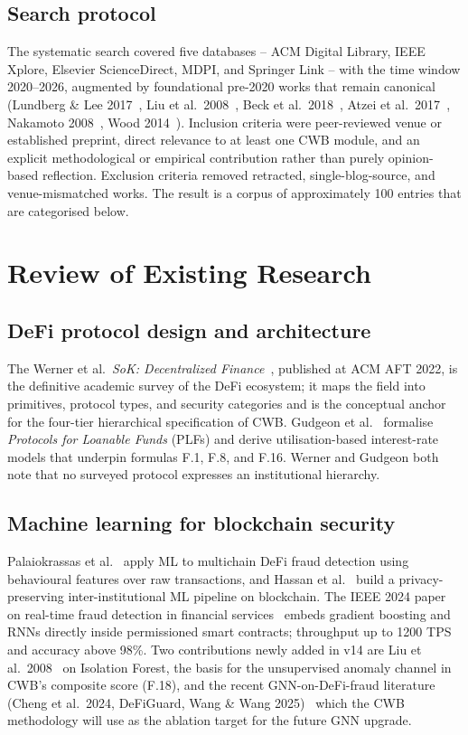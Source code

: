 \documentclass[12pt,a4paper]{report}
\begin{document}
\subsection{Search protocol}
\label{sec:prisma}
The systematic search covered five databases -- ACM Digital Library, IEEE Xplore, Elsevier ScienceDirect, MDPI, and Springer Link -- with the time window 2020--2026, augmented by foundational pre-2020 works that remain canonical (Lundberg \& Lee 2017~\cite{lundberg2017shap}, Liu et al.\ 2008~\cite{liu2008iforest}, Beck et al.\ 2018~\cite{beck2018governance}, Atzei et al.\ 2017~\cite{atzei2017sok}, Nakamoto 2008~\cite{nakamoto2008bitcoin}, Wood 2014~\cite{wood2014ethereum}). Inclusion criteria were peer-reviewed venue or established preprint, direct relevance to at least one CWB module, and an explicit methodological or empirical contribution rather than purely opinion-based reflection. Exclusion criteria removed retracted, single-blog-source, and venue-mismatched works. The result is a corpus of approximately 100 entries that are categorised below.

\section{Review of Existing Research}
\label{sec:lit-review}

\subsection{DeFi protocol design and architecture}
The Werner et al.\ \emph{SoK: Decentralized Finance}~\cite{werner2022sokDefi}, published at ACM AFT 2022, is the definitive academic survey of the DeFi ecosystem; it maps the field into primitives, protocol types, and security categories and is the conceptual anchor for the four-tier hierarchical specification of CWB. Gudgeon et al.~\cite{gudgeon2020plf} formalise \emph{Protocols for Loanable Funds} (PLFs) and derive utilisation-based interest-rate models that underpin formulas F.1, F.8, and F.16. Werner and Gudgeon both note that no surveyed protocol expresses an institutional hierarchy.

\subsection{Machine learning for blockchain security}
Palaiokrassas et al.~\cite{palaiokrassas2023ml} apply ML to multichain DeFi fraud detection using behavioural features over raw transactions, and Hassan et al.~\cite{hassan2022mlblockchain} build a privacy-preserving inter-institutional ML pipeline on blockchain. The IEEE 2024 paper on real-time fraud detection in financial services~\cite{aiblockchainFraud2024} embeds gradient boosting and RNNs directly inside permissioned smart contracts; throughput up to 1200 TPS and accuracy above 98\%. Two contributions newly added in v14 are Liu et al.\ 2008~\cite{liu2008iforest} on Isolation Forest, the basis for the unsupervised anomaly channel in CWB's composite score (F.18), and the recent GNN-on-DeFi-fraud literature (Cheng et al.\ 2024, DeFiGuard, Wang \& Wang 2025)~\cite{cheng2024gnnFraud,wang2024defiguard,wang2025gnnFraud} which the CWB methodology will use as the ablation target for the future GNN upgrade.
\end{document}
